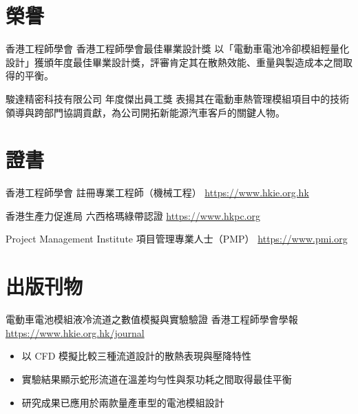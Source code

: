 \documentclass[a4paper, serif, 10pt]{moderncv}
\begin{document}
\section{榮譽}

        {香港工程師學會}
        {香港工程師學會最佳畢業設計獎}
        {}
        {}
        {以「電動車電池冷卻模組輕量化設計」獲頒年度最佳畢業設計獎，評審肯定其在散熱效能、重量與製造成本之間取得的平衡。}

        {駿達精密科技有限公司}
        {年度傑出員工獎}
        {}
        {}
        {表揚其在電動車熱管理模組項目中的技術領導與跨部門協調貢獻，為公司開拓新能源汽車客戶的關鍵人物。}
\section{證書}

        {香港工程師學會}
        {註冊專業工程師（機械工程）}
        {\url{https://www.hkie.org.hk}}
        {}
        {}

        {香港生產力促進局}
        {六西格瑪綠帶認證}
        {\url{https://www.hkpc.org}}
        {}
        {}

        {Project Management Institute}
        {項目管理專業人士（PMP）}
        {\url{https://www.pmi.org}}
        {}
        {}
\section{出版刊物}

        {電動車電池模組液冷流道之數值模擬與實驗驗證}
        {香港工程師學會學報}
        {\url{https://www.hkie.org.hk/journal}}
        {}
        {\begin{itemize}
\item 以 CFD 模擬比較三種流道設計的散熱表現與壓降特性
\item 實驗結果顯示蛇形流道在溫差均勻性與泵功耗之間取得最佳平衡
\item 研究成果已應用於兩款量產車型的電池模組設計
\end{itemize}}
\end{document}
